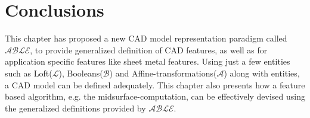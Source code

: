 \section{Conclusions}

This chapter has proposed a new CAD model representation paradigm called $\mathcal{ABLE}$, to provide generalized definition of CAD features, as well as for application specific features like sheet metal features.  Using just a few entities such as Loft({\bf $\mathcal{L}$}), Booleans({\bf $\mathcal{B}$}) and Affine-transformations({\bf $\mathcal{A}$}) along with entities, a CAD model can be defined adequately. This chapter also presents how a feature based algorithm, e.g. the midsurface-computation, can be effectively devised using the generalized definitions provided by $\mathcal{ABLE}$. %
